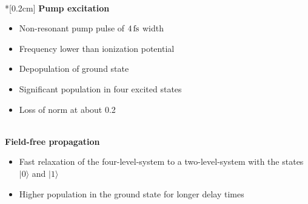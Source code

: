 \documentclass[12pt]{article}
\newcommand{\ket}[1]{|#1\rangle}
\begin{document}
{\begin{minipage}[c][27cm]{19cm}
\\*[0.2cm]
{\Large \bf \sf Pump excitation} \\
\bigskip \vspace{-5mm}
\begin{minipage}[!t]{9cm}
\begin{center}
\end{center}
\end{minipage}
\begin{minipage}[!t]{9cm}
\begin{itemize}
\item Non-resonant pump pulse of $\unit[4]{fs}$ width
\item Frequency lower than ionization potential
\item Depopulation of ground state
\item Significant population in four excited states
\item Loss of norm at about 0.2
\end{itemize}
\end{minipage} \\
{\Large \bf \sf Field-free propagation} \\
\bigskip \vspace{-5mm}
\begin{minipage}[!t]{9cm}
\begin{center}
\end{center}
\end{minipage}
\begin{minipage}[!t]{9cm}
\begin{itemize}
\item Fast relaxation of the four-level-system to a two-level-system with the states $\ket{0}$ and $\ket{1}$
\item Higher population in the ground state for longer delay times
\end{itemize}
\end{minipage}
\vspace{1cm}
\end{minipage} }
\vspace{3cm}
\end{document}
